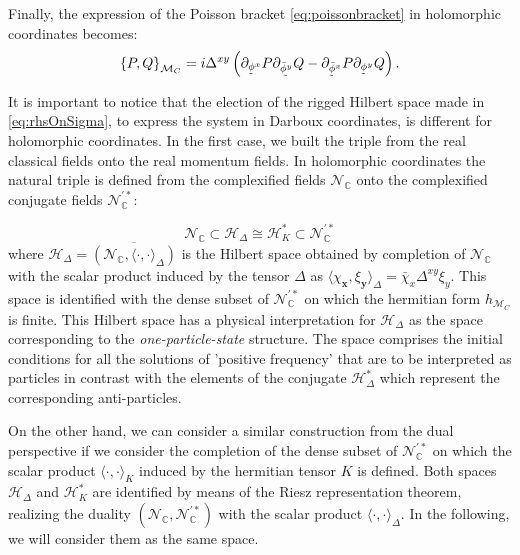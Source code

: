 \documentclass{elsarticle}%
\newcommand{\utilde}[1]{\underaccent{\tilde}{#1}}
\begin{document}
Finally, the expression of the Poisson bracket \eqref{eq:poissonbracket} in holomorphic coordinates becomes:
\begin{equation}
\label{eq:poissonHol}
\left\{P,Q\right\}_{\mathcal{M}_C}=
i\Delta^{xy}\left( \partial_{\utilde\phi^x}P\partial_{\utilde{\bar\phi^y}}Q-\partial_{\utilde{\bar\phi}^x}P\partial_{\utilde{\phi}^y}Q \right).
\end{equation}


It is important to notice that the election of the rigged Hilbert space made in \eqref{eq:rhsOnSigma}, to express the system in Darboux coordinates, is different for holomorphic coordinates. In the first case, we built the triple from the real classical fields onto the real momentum fields. In holomorphic coordinates the natural triple is defined from the complexified  fields 
$\mathcal{N}_{\mathbb{C}}$ onto the complexified conjugate fields $\mathcal{N}_{\mathbb{C}}^{\prime \ast}$:

\begin{equation}
\label{eq:HolomorphicTriple}
\mathcal{N}_{\mathbb{C}}\subset \mathcal{H}_\Delta\cong \mathcal{H}_K^*\subset {\mathcal{N}_{\mathbb{C}}^{\prime\ast}}
\end{equation}
 where $\mathcal{H}_\Delta=\overline{(\mathcal{N}_{\mathbb{C}},\langle \cdot,\cdot\rangle_\Delta)}$ is the  Hilbert space obtained by completion of $\mathcal{N}_{\mathbb{C}}$ with the scalar product induced by  the tensor $\Delta$ as $\langle \chi_{\mathbf{x}},\xi_{\mathbf{y}}\rangle_\Delta=\bar{\chi}_x\Delta^{xy}\xi_y$.  This space is identified with the dense subset of $\mathcal{N}_{\mathbb{C}}^{\prime *}$ on which the hermitian form $h_{\mathcal{M}_C}$ is finite. This Hilbert space  has a physical interpretation for $\mathcal{H}_\Delta$ as the space corresponding to the \textit{one-particle-state} structure. The space comprises the initial conditions for all the solutions of 'positive frequency' that are to be interpreted as particles in contrast with the elements of the conjugate $\mathcal{H}_{\Delta}^*$ which represent the corresponding anti-particles.    

On the other hand, we can consider a similar construction from the dual perspective if we consider the completion of  the dense subset of $\mathcal{N}_{\mathbb{C}}^{\prime*}$ on which the scalar product $\langle \cdot,\cdot\rangle_K$ induced by the hermitian tensor $K$ is defined.  Both spaces $\mathcal{H}_\Delta$ and $\mathcal{H}_K^*$ are identified by means of the Riesz representation theorem,  realizing the duality  $(\mathcal{N}_{\mathbb{C}},\mathcal{N}_{\mathbb{C}}^{\prime *})$ with the scalar product  $\langle \cdot,\cdot\rangle_\Delta$.  In the following, we will consider them as the same space.
\end{document}
